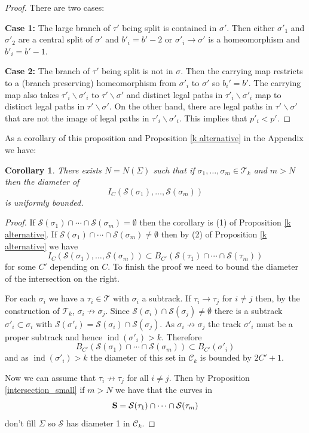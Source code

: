 \documentclass[11pt]{article}
\newtheorem{cor}[thm]{Corollary}
\theoremstyle{remark}
\def\S{{\mathcal S}}
\def\C{{\mathcal C}}
\def\ind{\operatorname{ind}}
\def\T{{\mathcal T}}
\newcommand{\bS}{{\bf S}}
\begin{document}
\begin{proof}
There are two cases:
  
{\bf Case 1:} The large branch of $\tau'$ being split is contained in $\sigma'$. Then either $\sigma'_1$ and $\sigma'_2$ are a central split of $\sigma'$ and $b'_i = b'-2$ or $\sigma'_i \to \sigma'$ is a homeomorphism and $b'_i = b' - 1$.

{\bf Case 2:}  The branch of $\tau'$ being split is not in $\sigma$. Then the carrying map restricts to a (branch preserving) homeomorphism from $\sigma'_i$ to $\sigma'$ so $b_i' = b'$. The carrying map also takes $\tau'_i \smallsetminus\sigma'_i$ to $\tau'\smallsetminus\sigma'$ and distinct legal paths in $\tau'_i \smallsetminus\sigma'_i$ map to distinct legal paths in $\tau'\smallsetminus\sigma'$. On the other hand, there are legal paths in $\tau'\smallsetminus \sigma'$ that are not the image of legal paths in $\tau'_i\smallsetminus\sigma'_i$. This implies that $p'_i < p'$.
\end{proof}

As a corollary of this proposition and Proposition \ref{k alternative} in the Appendix we have:
\begin{cor}\label{qtree_ii}
There exists $N = N(\Sigma)$ such that if $\sigma_1, \dots, \sigma_m \in \T_k$ and $m> N$ then the diameter of
$$I_C(\S(\sigma_1), \dots, \S(\sigma_m))$$
is uniformly bounded.
\end{cor}

\begin{proof}
If $\S(\sigma_1) \cap \cdots \cap \S(\sigma_m) = \emptyset$ then the corollary is (1) of Proposition \ref{k alternative}.
If $\S(\sigma_1) \cap \cdots \cap \S(\sigma_m) \neq \emptyset$ then by (2) of Proposition \ref{k alternative} we have 
$$I_{C}(\S(\sigma_1), \dots, \S(\sigma_m)) \subset B_{C'}(\S(\tau_1) \cap\cdots \cap\S(\tau_m))$$
for some $C'$ depending on $C$. To finish the proof we need to bound the diameter of the intersection on the right.

For each $\sigma_i$ we have a $\tau_i \in \T$ with $\sigma_i$ a
subtrack. If $\tau_i \to \tau_j$ for $i \neq j$ then, by the construction of $\T_k$,  $\sigma_i
\not\to\sigma_j$.  Since $\S(\sigma_i) \cap \S(\sigma_j) \neq \emptyset$ there is a subtrack $\sigma'_i \subset \sigma_i$ with $\S(\sigma'_i) = \S(\sigma_i) \cap \S(\sigma_j)$. As $\sigma_i \not\to\sigma_j$ the track $\sigma'_i$ must be a proper subtrack and hence $\ind(\sigma'_i) > k$. Therefore
$$B_{C'}(\S(\sigma_1)\cap \cdots \cap \S(\sigma_m)) \subset B_{C'}(\sigma'_i)$$
and as $\ind(\sigma'_i) > k$ the diameter of this set in $\C_k$ is bounded by $2C'+1$.

Now we can assume that $\tau_i \not\to \tau_j$ for all $i\neq j$. Then by Proposition \ref{intersection_small} if $m>N$ we have that the curves in 
$$\bS = \S(\tau_1) \cap\cdots \cap\S(\tau_m)$$
don't fill $\Sigma$ so $\S$ has diameter 1 in $\C_k$. 
\end{proof}
\end{document}
